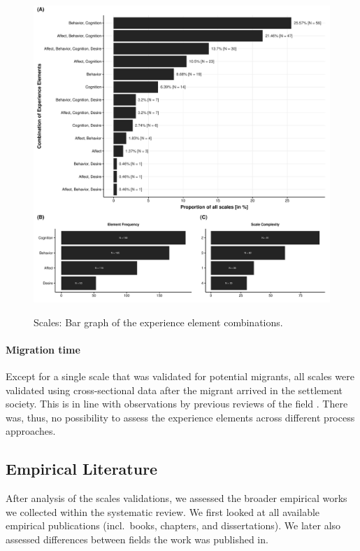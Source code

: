\begin{figure}[h]
\centering
\caption{Scales: Bar graph of the experience element combinations.}
\includegraphics[width=\textwidth]{Figures/ABCDFreq-1}
\label{fig:ElementsScales}
\end{figure}



\paragraph{Migration time}

Except for a single scale that was validated for potential migrants, all
scales were validated using cross-sectional data after the migrant
arrived in the settlement society. This is in line with observations by
previous reviews of the field \citep[e.g.,][]{Brown2011}. There was,
thus, no possibility to assess the experience elements across different
process approaches.

\subsection{Empirical Literature}

After analysis of the scales validations, we assessed the broader
empirical works we collected within the systematic review. We first
looked at all available empirical publications (incl.~books, chapters,
and dissertations). We later also assessed differences between fields
the work was published in.

